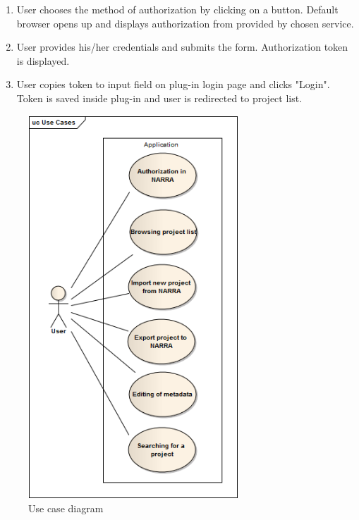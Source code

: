 \documentclass[thesis=B,english]{FITthesis}[2012/10/20]
\begin{document}
\begin{description}
\begin{enumerate}
		\item User chooses the method of authorization by clicking on a button. Default browser opens up and displays authorization from provided by chosen service.
		\item User provides his/her credentials and submits the form. Authorization token is displayed.
		\item User copies token to input field on plug-in login page and clicks "Login". Token is saved inside plug-in and user is redirected to project list. 
	\end{enumerate}
	\end{description}
	\begin{figure}
		\centering
		\includegraphics[width=0.7\textwidth]{UseCases.png}
		\caption{Use case diagram}\label{fig:usecase}
	\end{figure}
\end{document}

